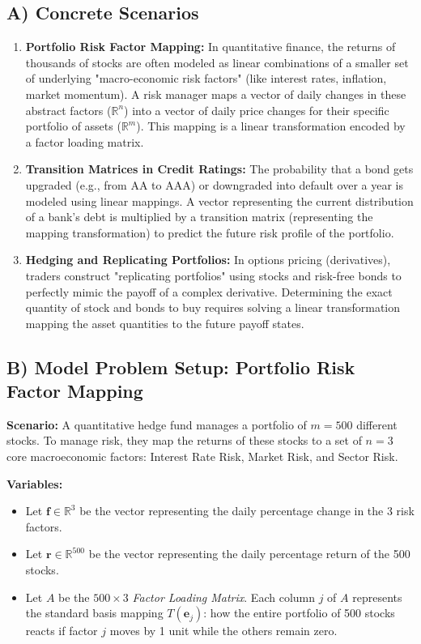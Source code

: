 \documentclass[11pt]{article}
\begin{document}
\subsection{A) Concrete Scenarios}
\begin{enumerate}
    \item \textbf{Portfolio Risk Factor Mapping:} In quantitative finance, the returns of thousands of stocks are often modeled as linear combinations of a smaller set of underlying "macro-economic risk factors" (like interest rates, inflation, market momentum). A risk manager maps a vector of daily changes in these abstract factors ($\mathbb{R}^n$) into a vector of daily price changes for their specific portfolio of assets ($\mathbb{R}^m$). This mapping is a linear transformation encoded by a factor loading matrix.
    \item \textbf{Transition Matrices in Credit Ratings:} The probability that a bond gets upgraded (e.g., from AA to AAA) or downgraded into default over a year is modeled using linear mappings. A vector representing the current distribution of a bank's debt is multiplied by a transition matrix (representing the mapping transformation) to predict the future risk profile of the portfolio.
    \item \textbf{Hedging and Replicating Portfolios:} In options pricing (derivatives), traders construct "replicating portfolios" using stocks and risk-free bonds to perfectly mimic the payoff of a complex derivative. Determining the exact quantity of stock and bonds to buy requires solving a linear transformation mapping the asset quantities to the future payoff states.
\end{enumerate}

\subsection{B) Model Problem Setup: Portfolio Risk Factor Mapping}
\textbf{Scenario:} A quantitative hedge fund manages a portfolio of $m = 500$ different stocks. To manage risk, they map the returns of these stocks to a set of $n = 3$ core macroeconomic factors: Interest Rate Risk, Market Risk, and Sector Risk.

\textbf{Variables:}
\begin{itemize}
    \item Let $\mathbf{f} \in \mathbb{R}^3$ be the vector representing the daily percentage change in the 3 risk factors.
    \item Let $\mathbf{r} \in \mathbb{R}^{500}$ be the vector representing the daily percentage return of the 500 stocks.
    \item Let $A$ be the $500 \times 3$ \textit{Factor Loading Matrix}. Each column $j$ of $A$ represents the standard basis mapping $T(\mathbf{e}_j)$: how the entire portfolio of 500 stocks reacts if factor $j$ moves by 1 unit while the others remain zero.
\end{itemize}
\end{document}

